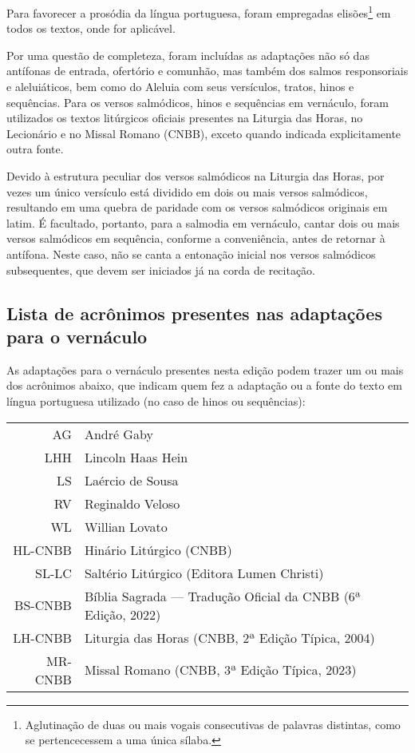 Para favorecer a prosódia da língua portuguesa, foram empregadas elisões\footnote{Aglutinação de duas ou mais vogais consecutivas de palavras distintas, como se pertencecessem a uma única sílaba.} em todos os textos, onde for aplicável.

Por uma questão de completeza, foram incluídas as adaptações não só das antífonas de entrada, ofertório e comunhão, mas também dos salmos responsoriais e aleluiáticos, bem como do Aleluia com seus versículos, tratos, hinos e sequências. Para os versos salmódicos, hinos e sequências em vernáculo, foram utilizados os textos litúrgicos oficiais presentes na Liturgia das Horas, no Lecionário e no Missal Romano (CNBB), exceto quando indicada explicitamente outra fonte.

Devido à estrutura peculiar dos versos salmódicos na Liturgia das Horas, por vezes um único versículo está dividido em dois ou mais versos salmódicos, resultando em uma quebra de paridade com os versos salmódicos originais em latim. É facultado, portanto, para a salmodia em vernáculo, cantar dois ou mais versos salmódicos em sequência, conforme a conveniência, antes de retornar à antífona. Neste caso, não se canta a entonação inicial nos versos salmódicos subsequentes, que devem ser iniciados já na corda de recitação.

\subsection{Lista de acrônimos presentes nas adaptações para o vernáculo}

As adaptações para o vernáculo presentes nesta edição podem trazer um ou mais dos acrônimos abaixo, que indicam quem fez a adaptação ou a fonte do texto em língua portuguesa utilizado (no caso de hinos ou sequências):

\begin{center}
  \begin{tabular}{rl}
    AG      & André Gaby                                                    \\
    LHH     & Lincoln Haas Hein                                             \\
    LS      & Laércio de Sousa                                              \\
    RV      & Reginaldo Veloso                                              \\
    WL      & Willian Lovato                                                \\
    HL-CNBB & Hinário Litúrgico (CNBB)                                      \\
    SL-LC   & Saltério Litúrgico (Editora Lumen Christi)                    \\
    BS-CNBB & Bíblia Sagrada --- Tradução Oficial da CNBB (6ª Edição, 2022) \\
    LH-CNBB & Liturgia das Horas (CNBB, 2ª Edição Típica, 2004)             \\
    MR-CNBB & Missal Romano (CNBB, 3ª Edição Típica, 2023)                  \\
  \end{tabular}
\end{center}


